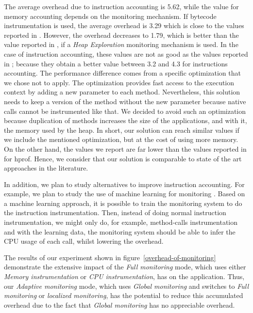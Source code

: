 The average overhead due to instruction accounting is 5.62, while the value for memory accounting depends on the monitoring mechanism.
If bytecode instrumentation is used, the average overhead is 3.29 which is close to the values reported in \cite{Binder:2009:PPV:1464245.1464249}.
However, the overhead decreases to 1.79, which is better than the value reported in \cite{Binder:2009:PPV:1464245.1464249}, if a \textit{Heap Exploration} monitoring mechanism is used.
In the case of instruction accounting, these values are not as good as the values reported in \cite{Binder:2009:PPV:1464245.1464249}; because they obtain a better value between 3.2 and 4.3 for instructions accounting.
The performance difference comes from a specific optimization that we chose not to apply.
The optimization provides fast access to the execution context by adding a new parameter to each method.
Nevertheless, this solution needs to keep a version of the method without the new parameter because native calls cannot be instrumented like that. 
We decided to avoid such an optimization because duplication of methods increases the size of the applications, and with it, the memory used by the heap.
In short, our solution can reach similar values if we include the mentioned optimization, but at the cost of using more memory.
On the other hand, the values we report are far lower than the values reported in \cite{Binder:2009:PPV:1464245.1464249} for hprof.
Hence, we consider that our solution is comparable to state of the art approaches in the literature.

In addition, we plan to study alternatives to improve instruction accounting. %
For example, we plan to study the use of machine learning for monitoring \cite{tesauro2006hybrid}. Based on a machine learning approach, it is possible to train the monitoring system to do the instruction instrumentation. Then, instead of doing normal instruction instrumentation, we might only do, for example, method-calls instrumentation and with the learning data, the monitoring system should be able to infer the CPU usage of each call, whilst lowering the overhead.

The results of our experiment shown in figure~\ref{overhead-of-monitoring} demonstrate the extensive impact of the \emph{Full monitoring} mode, which uses either \emph{Memory instrumentation} or \emph{CPU instrumentation}, has on the application. Thus, our \emph{Adaptive monitoring} mode, which uses \emph{Global monitoring} and switches to \emph{Full monitoring} or \emph{localized monitoring}, has the potential to reduce this accumulated overhead due to the fact that \emph{Global monitoring} has no appreciable overhead. 

